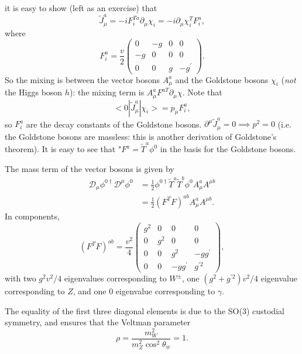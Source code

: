 it is easy to show (left as an exercise) that
\begin{equation}
\tilde{J}_\mu^a = -i F^{T a}_i \partial_\mu \chi_i = -i \partial_\mu \chi_i^T F_i^a,
\end{equation}
where
\[F_i^a = \frac{v}{2} \left( \begin{array}{cccc}
0 & -g & 0 & 0 \\
-g & 0 & 0 & 0 \\
0 & 0 & g & -g^\prime 
\end{array} \right). \]
So the mixing is between the vector bosons $A_\mu^a$ and the Goldstone bosons $\chi_i$ (\textit{not} the Higgs boson $h$): the mixing term is $A_\mu^a F^{a T} \partial_\mu \chi$. Note that
\begin{equation}
<0|\tilde{J}_\mu^a|\chi_i> = p_\mu F^a_i,
\end{equation}
so $F_i^a$ are the decay constants of the Goldstone bosons. $\partial^\mu \tilde{J}_\mu^a = 0 \implies p^2=0$ (i.e. the Goldstone bosons are massless: this is another derivation of Goldstone's theorem). It is easy to see that "$F^a = \tilde{T}^a \phi^0$ in the basis for the Goldstone bosons.

The mass term of the vector bosons is given by
\begin{equation}
\begin{split}
\mathcal{D}_\mu \phi^{0 \dagger} \mathcal{D}^\mu \phi^0 &= \frac{1}{2} \phi^{0 \dagger} \tilde{T}^a \tilde{T}^b \phi^0 A_\mu^a A^{\mu b} \\
&= \frac{1}{2}(F^TF)^{ab} A_\mu^a A^{\mu b}.
\end{split}
\end{equation}
In components,
\[(F^TF)^{ab} = \frac{v^2}{4} \left( \begin{array}{cccc}
g^2 & 0 & 0 & 0 \\
0 & g^2 & 0 & 0 \\
0 & 0 & g^2 & -gg^\prime \\
0 & 0 & - gg^\prime & g^{\prime 2} 
\end{array} \right), \]
with two $g^2v^2/4$ eigenvalues corresponding to $W^\pm$, one $(g^2 + g^{\prime 2})v^2/4$ eigenvalue corresponding to $Z$, and one $0$ eigenvalue corresponding to $\gamma$.

The equality of the first three diagonal elements is due to the SO(3) custodial symmetry, and ensures that the Veltman parameter
\begin{equation}
\rho = \frac{m_W^2}{m_Z^2 \cos^2\theta_w} = 1.
\end{equation}
%
